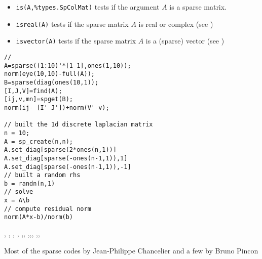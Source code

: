 \begin{itemize}
    \item \verb+is(A,%types.SpColMat)+ tests if the argument $A$ is a sparse matrix.
    \item \verb+isreal(A)+ tests if the sparse matrix $A$ is real or complex (see )
    \item \verb+isvector(A)+ tests if the sparse matrix $A$ is a (sparse) vector (see )
\end{itemize}


\begin{examples}
\begin{Verbatim}
//
A=sparse((1:10)'*[1 1],ones(1,10));
norm(eye(10,10)-full(A));
B=sparse(diag(ones(10,1));
[I,J,V]=find(A);
[ij,v,mn]=spget(B);
norm(ij- [I' J'])+norm(V'-v);

// built the 1d discrete laplacian matrix
n = 10;
A = sp_create(n,n);
A.set_diag[sparse(2*ones(n,1))]
A.set_diag[sparse(-ones(n-1,1)),1]
A.set_diag[sparse(-ones(n-1,1)),-1]
// built a random rhs
b = randn(n,1)
// solve
x = A\b
// compute residual norm
norm(A*x-b)/norm(b)
\end{Verbatim}
\end{examples}

\begin{manseealso}
,
,
,
,
,,
,,,
,,
\end{manseealso}

\begin{authors}
   Most of the sparse codes by Jean-Philippe Chancelier and a few by Bruno Pincon
\end{authors}

